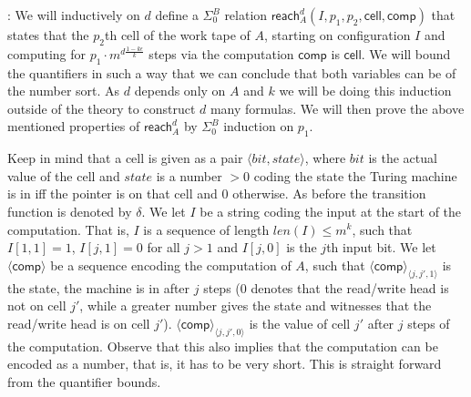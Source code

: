 \documentclass{LMCS}
\newenvironment{proof}{\QuadSpace\par\noindent{\bf
Proof}:}{\EndProof\HalfSpace} \fi
\newcommand{\QuadSpace}{}\newcommand{\HalfSpace}{}\newcommand{\FullSpace}{}\newcommand{\EndProof}{ \hfill \vrule width 1ex height 1ex depth 0pt }
\newenvironment{proof}{

\smallskip
\noindent\emph{Proof.}}{\hfill\(\Box\)
\bigskip
} \fi
\begin{document}
\begin{proof}
  We will inductively on $d$ define a $\Sigma^B_0$ relation $\mathsf{reach}^d_A(I,p_1,p_2,\mathsf{cell},\mathsf{comp})$
  that states that the $p_2$th cell of the work tape of $A$, starting on configuration $I$ and computing
  for $p_1\cdot m^{d\frac{1-k\epsilon}{k}}$ steps via the computation $\mathsf{comp}$ is $\mathsf{cell}$. We will bound the
  quantifiers in such a way that we can conclude that both variables can be of the number sort. As $d$ depends
  only on $A$ and $k$ we will be doing this induction outside of the theory to construct $d$ many formulas. We
  will then prove the above mentioned properties of $\mathsf{reach}^d_A$ by $\Sigma^B_0$ induction
  on $p_1$.

  Keep in mind that a cell is given as a pair $\langle bit, state\rangle$, where $bit$ is the actual
  value of the cell and $state$ is a number $>0$ coding the state the Turing machine is in iff the
  pointer is on that cell and $0$ otherwise. As before the transition function is denoted by $\delta$. We let
  $I$ be a string coding the input at the start of the computation. That is, $I$ is a sequence of length
  $len(I)\leq m^k$, such that $I[1,1]=1$, $I[j,1]=0$ for all $j>1$ and $I[j,0]$ is the $j$th input bit.
  We let $\langle\mathsf{comp}\rangle$ be a sequence encoding the computation of $A$, such that
  $\langle\mathsf{comp}\rangle_{\langle j,j',1\rangle}$ is the state, the machine is in after $j$ steps (0 denotes that the
  read/write head is not on cell $j'$, while a greater number gives the
  state and witnesses that the read/write head is on cell $j'$). $\langle\mathsf{comp}\rangle_{\langle j,j',0\rangle}$
  is the value of cell $j'$ after $j$ steps of the computation. Observe that this also implies that the
  computation can be encoded as a number, that is, it has to be very short. This is straight forward from the
  quantifier bounds.


\end{proof}
\end{document}
